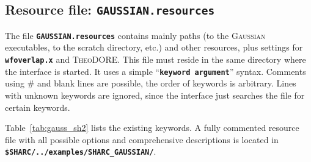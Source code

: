 \documentclass[a4paper,10pt,DIV=15,openany]{scrbook}
\newcommand{\ttt}[1]{\textbf{\texttt{#1}}}
\begin{document}
\subsection{Resource file: \ttt{GAUSSIAN.resources}}

The file \ttt{GAUSSIAN.resources} contains mainly paths (to the \textsc{Gaussian} executables, to the scratch directory, etc.) and other resources, plus settings for \ttt{wfoverlap.x} and \textsc{TheoDORE}. This file must reside in the same directory where the interface is started. It uses a simple ``\ttt{keyword argument}'' syntax. Comments using \# and blank lines are possible, the order of keywords is arbitrary. Lines with unknown keywords are ignored, since the interface just searches the file for certain keywords.

Table~\ref{tab:gauss_sh2} lists the existing keywords.
A fully commented resource file with all possible options and comprehensive descriptions is located in \ttt{\$SHARC/../examples/SHARC\_GAUSSIAN/}.
\end{document}

